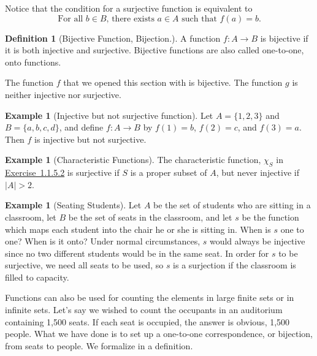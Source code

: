 \documentclass[10pt,]{book}
\theoremstyle{plain}
\theoremstyle{definition}
\newtheorem{definition}[theorem]{Definition}
\theoremstyle{definition}
\newtheorem{example}[theorem]{Example}
\theoremstyle{definition}
\begin{document}
Notice that the condition for a surjective function is equivalent to 
\begin{equation*}\textrm{For all } b \in  B\textrm{, there exists } a\in A \textrm{ such that } f(a)=b.\end{equation*}%
\begin{definition}[Bijective Function, Bijection.]\label{def-bijective-function}
 A function \(f: A \rightarrow B\) is bijective if it is both injective and surjective. Bijective functions are also called one-to-one, onto functions.%
\end{definition}
\par
The function \(f\) that we opened this section with is bijective. The function \(g\) is neither injective nor
surjective.%
\begin{example}[Injective but not surjective function]\label{ex-injective-notsurjective}
Let \(A = \{1, 2, 3\}\) and \(B = \{a, b, c, d\}\), and define \(f:A \rightarrow  B\) by \(f(1) = b\), \(f(2) = c\), and \(f(3)
= a\). Then \( f \) is injective but not surjective.%
\end{example}
\begin{example}[Characteristic Functions]\label{ex-characteristic-properties}
The characteristic function, \(\chi _S\) in \hyperlink{exercise-characteristic-function}{Exercise~1.1.5.2}  is surjective if \(S\) is a proper subset of \(A\), but never injective if \(\lvert A \rvert > 2\).%
\end{example}
\begin{example}[Seating Students]\label{ex-classroom}
Let \(A\) be the set of students who are sitting in a classroom,  let \(B\) be the set of seats in the classroom, and let \(s\) be the function which maps each student into the chair he or she is sitting in. When is \(s\) one to one? When is it onto? Under normal circumstances, \(s\)  would always be injective since no two different students would be in the same seat.  In order for \(s\) to be surjective, we need all seats to be used, so \(s\)  is a surjection if the classroom is filled to capacity.%
\end{example}
\par
Functions can also be used for counting the elements in large finite sets or in infinite sets. Let's say we wished to count the occupants in an auditorium containing 1,500 seats. If each seat is occupied, the answer is obvious, 1,500 people. What we have done is to set up a one-to-one correspondence, or bijection, from seats to people. We formalize in a definition.%
\end{document}
